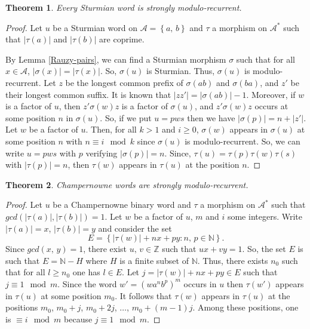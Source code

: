 \documentclass[a4 paper,12pt]{article}
\newtheorem{theorem}{Theorem}[section]
\begin{document}
\begin{theorem} \label{smr}
Every Sturmian word is strongly modulo-recurrent.

\end{theorem}

\begin{proof}  
Let $u$ be a Sturmian word on $\mathcal{A}=\left\{a,\,b\right\}$ and  $\tau$ a morphism on $\mathcal{A}^{*}$ such that $\left|\tau(a)\right|$ and $\left|\tau(b)\right|$ are coprime.

 By Lemma \ref{Rauzy-pairs},   we can find a Sturmian morphism $\sigma$ such that for all $x\in \mathcal{A}$,  $\left|\sigma\left(x\right)\right|=\left|\tau\left(x\right)\right|$. So, $\sigma\left(u\right)$ is Sturmian. Thus,  $\sigma\left(u\right)$ is modulo-recurrent. Let $z$ be  the longest common prefix of $\sigma(ab)$ and $\sigma(ba)$, and $z'$ be their longest common suffix. It is known \cite{17} that $|zz'|=|\sigma(ab)|-1$. Moreover, if $w$ is a factor of $u$, then $z'\sigma(w)z$ is a factor of $\sigma(u)$, and $z'\sigma(w)z$ occurs at some position $n$ in $\sigma (u)$. So, if we put  $u=pws$  then we have $|\sigma(p)|=n+|z'|$.%
  Let $w$ be a factor of $u$. Then, for all  $k>1$ and $i\geq 0$, $\sigma\left(w\right)$ appears  in  $\sigma\left(u\right)$ at some position $n$ with $n\equiv i\mod k$ since $\sigma\left(u\right)$ is modulo-recurrent. So, we can write $u=pws$ with $p$ verifying $\left|\sigma\left(p\right)\right|=n$. Since, $\tau(u)=\tau(p)\tau(w)\tau(s)$ with $\left|\tau\left(p\right)\right|=n$, then $\tau\left(w\right)$ appears in $\tau\left(u\right)$ at the position $n$. \end{proof}


\begin{theorem}
Champernowne  words are strongly modulo-recurrent.
\end{theorem}
\begin{proof}  
Let $u$ be a Champernowne binary word and  $\tau$ a morphism on $\mathcal{A}^{*}$ such that $gcd\left(\left|\tau(a)\right|,\left|\tau(b)\right|\right)=1$. Let $w$ be a factor of $u$,  $m$ and $i$ some integers. Write $\left|\tau(a)\right|=x$, $\left|\tau(b)\right|=y$ and consider the set 
$$E=\left\{\left|\tau\left(w\right)\right|+nx+py: n,\, p\in \mathbb{N}\right\}.$$
 Since $gcd(x,\,y)=1$, there exist $u,\, v\in\mathbb{Z}$ such that $ux+vy=1$. So, the set $E$ is such that $E=\mathbb{N}- H$ where $H$ is a finite subset of $\mathbb{N}$. Thus, there exists $n_0$ such that for all $l\geq n_0$ one has $l\in E$. Let $j=\left|\tau\left(w\right)\right|+nx+py \in E$ such that $j\equiv 1 \mod m$. Since the word $w'=\left(wa^nb^p\right)^m$ occurs  in $u$ then $\tau(w')$  appears in $\tau(u)$ at some position $m_0$. It follows that $\tau(w)$ appears in $\tau(u)$ at the  positions $m_0$, $m_0+j$, $m_0+2j$, $\ldots$, $m_0+(m-1)j$. Among these positions, one is $\equiv i\mod m$ because $j\equiv 1\mod m$. \end{proof}
\end{document}
